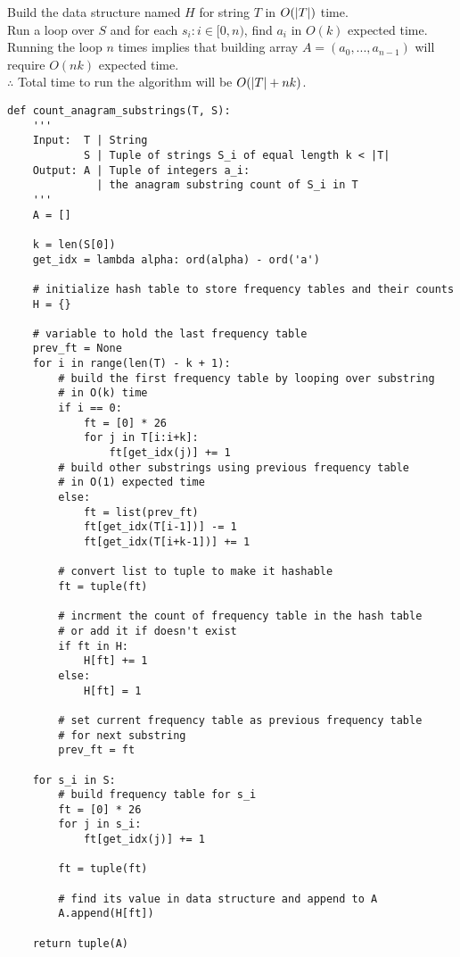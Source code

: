 \documentclass[12pt,twoside]{article}
\begin{document}
\begin{problems}
\begin{problemparts}
Build the data structure named $H$ for string $T$ in $O(\left| T\right|)$ time. \\
Run a loop over $S$ and for each $s_i : i \in [0, n)$, find $a_i$ in $O(k)$ expected time. \\
Running the loop $n$ times implies that building array $A = (a_0, ..., a_{n-1})$ will require $O(nk)$ expected time. \\

$\therefore$ Total time to run the algorithm will be $O(\left| T\right| + nk)$.
\newpage
\problempart 
\begin{lstlisting}
def count_anagram_substrings(T, S):
    '''
    Input:  T | String
            S | Tuple of strings S_i of equal length k < |T|
    Output: A | Tuple of integers a_i:
              | the anagram substring count of S_i in T
    '''
    A = []

    k = len(S[0])
    get_idx = lambda alpha: ord(alpha) - ord('a')

    # initialize hash table to store frequency tables and their counts
    H = {}

    # variable to hold the last frequency table
    prev_ft = None
    for i in range(len(T) - k + 1):
        # build the first frequency table by looping over substring
        # in O(k) time
        if i == 0:
            ft = [0] * 26
            for j in T[i:i+k]:
                ft[get_idx(j)] += 1
        # build other substrings using previous frequency table
        # in O(1) expected time
        else:
            ft = list(prev_ft)
            ft[get_idx(T[i-1])] -= 1
            ft[get_idx(T[i+k-1])] += 1

        # convert list to tuple to make it hashable
        ft = tuple(ft)

        # incrment the count of frequency table in the hash table
        # or add it if doesn't exist
        if ft in H:
            H[ft] += 1
        else:
            H[ft] = 1

        # set current frequency table as previous frequency table
        # for next substring
        prev_ft = ft

    for s_i in S:
        # build frequency table for s_i
        ft = [0] * 26
        for j in s_i:
            ft[get_idx(j)] += 1

        ft = tuple(ft)

        # find its value in data structure and append to A
        A.append(H[ft])

    return tuple(A)

\end{lstlisting}
\end{problemparts}

\end{problems}
\end{document}
